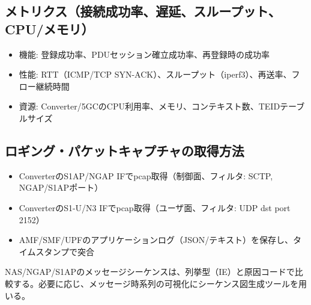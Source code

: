 \subsection{メトリクス（接続成功率、遅延、スループット、CPU/メモリ）}
\begin{itemize}
	\item 機能: 登録成功率、PDUセッション確立成功率、再登録時の成功率
	\item 性能: RTT（ICMP/TCP SYN-ACK）、スループット（iperf3）、再送率、フロー継続時間
	\item 資源: Converter/5GCのCPU利用率、メモリ、コンテキスト数、TEIDテーブルサイズ
\end{itemize}

\subsection{ロギング・パケットキャプチャの取得方法}
\begin{itemize}
	\item ConverterのS1AP/NGAP IFでpcap取得（制御面、フィルタ: SCTP, NGAP/S1APポート）
	\item ConverterのS1-U/N3 IFでpcap取得（ユーザ面、フィルタ: UDP dst port 2152）
	\item AMF/SMF/UPFのアプリケーションログ（JSON/テキスト）を保存し、タイムスタンプで突合
\end{itemize}
NAS/NGAP/S1APのメッセージシーケンスは、列挙型（IE）と原因コードで比較する。必要に応じ、メッセージ時系列の可視化にシーケンス図生成ツールを用いる\cite{Fraire2021}。
